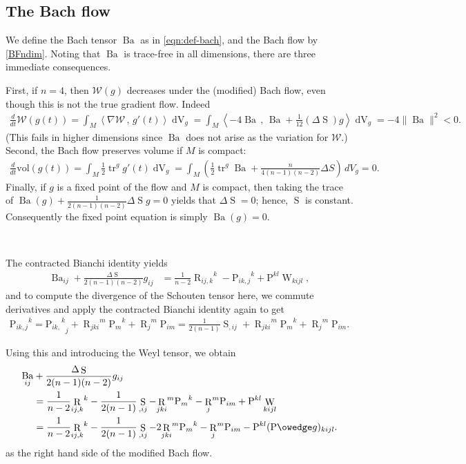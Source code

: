 \documentclass[10pt,reqno]{amsart}
\newcommand{\sW}{\mathcal{W}}
\DeclareMathOperator{\tr}{tr}
\DeclareMathOperator{\dvol}{dV}
\DeclareMathOperator{\Rc}{R}
\renewcommand{\P}{\mathrm{P}}
\DeclareMathOperator{\W}{W}
\DeclareMathOperator{\Ba}{Ba}
\DeclareMathOperator{\Scal}{S}
\DeclareMathOperator{\R}{R}
\newcommand{\inn}[2]{\left\langle #1 \, , \, #2 \right\rangle}
\begin{document}
\subsection{The Bach flow}
We define the Bach tensor $\Ba$ as in \eqref{eqn:def-bach}, and the Bach flow by \eqref{BFndim}. Noting that $\Ba$ is trace-free in all dimensions, there are three immediate consequences. 

First, if $n=4$, then $\sW(g)$ decreases under the (modified) Bach flow, even though this is not the true gradient flow. Indeed
\begin{align*}
\frac{d}{dt} \sW(g(t)) = \int_{M} \inn{ \nabla \sW}{g'(t)} \dvol_g = \int_{M} \inn{ -4 \Ba}{\Ba + \frac{1}{12} (\Delta \Scal) g} \dvol_g = -4 \| \Ba \|^2 < 0.
\end{align*}
(This fails in higher dimensions since $\Ba$ does not arise as the variation for $\sW$.) 
Second, the Bach flow preserves volume if $M$ is compact: 
\begin{align} \label{eqn:var-vol}
\frac{d}{dt} \mathrm{vol}(g(t)) = \int_{M} \frac{1}{2} \tr^g g'(t) \dvol_g = \int_{M} \left(\frac12 \tr^g \Ba + \frac{n}{4(n-1)(n-2)} \Delta S\right) \, dV_g = 0.
\end{align}
Finally, if $g$ is a fixed point of the flow and $M$ is compact, then taking the trace of $\Ba(g) + \frac{1}{2(n-1)(n-2)} \Delta \Scal g = 0$ yields that
$\Delta \Scal = 0$; hence, $\Scal$ is constant.  Consequently the fixed point equation is simply $\Ba(g) = 0$.

\

The contracted Bianchi identity yields
\begin{align} \label{eqn:def-mbach}
\Ba_{ij} + \frac{ \Delta \Scal}{2(n-1)(n-2)} g_{ij} &= \frac{1}{n-2} {\Rc_{ij,k}}^k   - {\P_{ik,j}}^k + \P^{kl} \W_{kijl},
\end{align}
and to compute the divergence of the Schouten tensor here, we commute derivatives and apply the contracted Bianchi identity again to get
\begin{align*} 
{\P_{ik,j}}^k = {{\P_{ik,}}^k}_j + {\R_{jki}}^m {\P_{m}}^k + {\Rc_{j}}^m \P_{im} %
= \frac{1}{2(n-1)} \Scal_{,ij} + {\R_{jki}}^m {\P_{m}}^k + {\Rc_{j}}^m \P_{im}.
\end{align*}

Using this and introducing the Weyl tensor, we obtain 
\begin{align} \label{eqn:def-mbach-2}
\begin{aligned}
\Ba_{ij} &+  \frac{ \Delta \Scal}{2(n-1)(n-2)} g_{ij} \\
&= \frac{1}{n-2}{\Rc_{ij,k}}^k - \frac{1}{2(n-1)} \Scal_{,ij} - {\R_{jki}}^m {\P_{m}}^k - {\Rc_{j}}^m \P_{im} + \P^{kl} \W_{kijl} \\
&= \frac{1}{n-2} {\Rc_{ij,k}}^k  - \frac{1}{2(n-1)}  \Scal_{,ij} - 2 {\R_{jki}}^m {\P_{m}}^k - {\Rc_{j}}^m \P_{im} - \P^{kl} (\P \owedge g)_{kijl}. 
\end{aligned}
\end{align}
as the right hand side of the modified Bach flow. 
\end{document}
